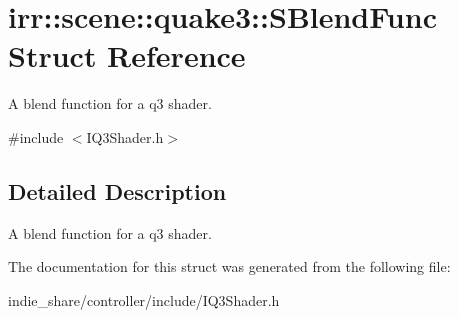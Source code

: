 \hypertarget{structirr_1_1scene_1_1quake3_1_1SBlendFunc}{}\section{irr\+:\+:scene\+:\+:quake3\+:\+:S\+Blend\+Func Struct Reference}
\label{structirr_1_1scene_1_1quake3_1_1SBlendFunc}


A blend function for a q3 shader.  




{\ttfamily \#include $<$I\+Q3\+Shader.\+h$>$}



\subsection{Detailed Description}
A blend function for a q3 shader. 

The documentation for this struct was generated from the following file\+:\begin{DoxyCompactItemize}
\item 
indie\+\_\+share/controller/include/I\+Q3\+Shader.\+h\end{DoxyCompactItemize}
